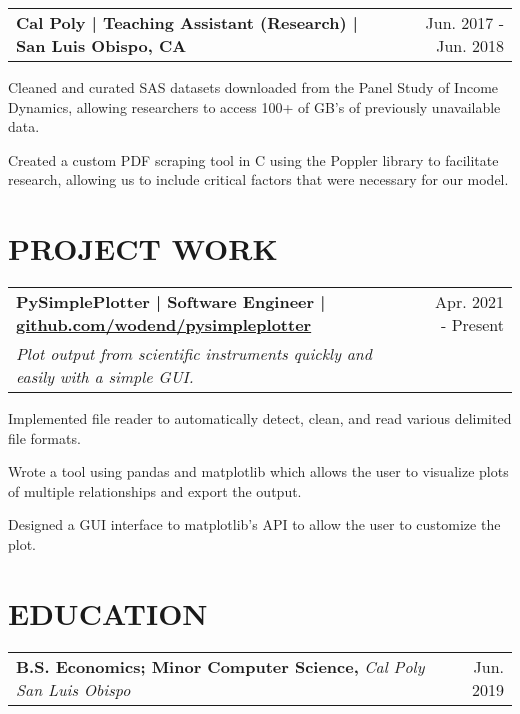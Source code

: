 \documentclass{article}
\makeatletter
\newcommand{\beginResumeList}{\begin{itemize}\setlength\itemsep{0em}\begin{minipage}{0.9\textwidth}}
\newcommand{\resumeListEnd}{\end{minipage}\end{itemize}}
\newcommand{\normalItem}[1]{\normalsize\item{#1}}
\newcommand{\experience}[2]{
  \begin{tabular*}{\textwidth}[t]{l@{\extracolsep{\fill}}r}
    \normalsize\textbf{#1} & \normalsize #2 \\
  \end{tabular*}
}
\newcommand{\education}[3]{
  \begin{tabular*}{\textwidth}[t]{l@{\extracolsep{\fill}}r}
    \normalsize\textbf{#1, }\textit{#2} & \normalsize #3 \\
  \end{tabular*}\vspace{-10pt}
}
\newcommand{\project}[3]{
  \begin{tabular*}{\textwidth}[t]{l@{\extracolsep{\fill}}r}
    \normalsize\textbf{#1} & \normalsize{#2} \\
    \normalsize\textit{#3}
  \end{tabular*}
}
\makeatother
\begin{document}

  \experience
    {Cal Poly | Teaching Assistant (Research) | San Luis Obispo, CA}
    {Jun. 2017 - Jun. 2018}
    \beginResumeList
      \normalItem{Cleaned and curated SAS datasets downloaded from the Panel Study of Income Dynamics, allowing researchers to access 100+ of GB's of previously unavailable data.}
      \normalItem{Created a custom PDF scraping tool in C using the Poppler library to facilitate research, allowing us to include critical factors that were necessary for our model.}
    \resumeListEnd

\section{PROJECT WORK}
  \project
    {PySimplePlotter | Software Engineer | \href{https://github.com/wodend/pysimpleplotter}{github.com/wodend/pysimpleplotter}}
    {Apr. 2021 - Present}
    {Plot output from scientific instruments quickly and easily with a simple GUI.}
    \beginResumeList
      \normalItem{Implemented file reader to automatically detect, clean, and read various delimited file formats.}
      \normalItem{Wrote a tool using pandas and matplotlib which allows the user to visualize plots of multiple relationships and export the output.}
      \normalItem{Designed a GUI interface to matplotlib's API to allow the user to customize the plot.}
    \resumeListEnd

\section{EDUCATION}
  \education
    {B.S. Economics; Minor Computer Science}
    {Cal Poly San Luis Obispo}
    {Jun. 2019}
\end{document}
